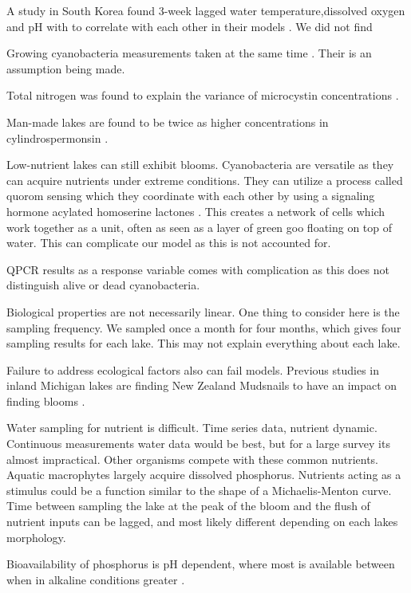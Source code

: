 A study in South Korea found 3-week lagged water temperature,dissolved oxygen and pH with to correlate with each other in their models \cite{ahn_evaluation_2011}.
We did not find

Growing cyanobacteria measurements taken at the same time . Their is an assumption being made.

Total nitrogen was found to explain the variance of microcystin concentrations \cite{taranu_predicting_2017}.

Man-made lakes are found to be twice as higher concentrations in cylindrospermonsin \cite{loftin_cyanotoxins_2016}.





Low-nutrient lakes can still exhibit blooms.
Cyanobacteria are versatile as they can acquire nutrients under extreme conditions. They can utilize a process called quorom sensing which they coordinate with each other by using a signaling hormone acylated homoserine lactones \cite{van_mooy_quorum_2012}. This creates a network of cells which work together as a unit, often as seen as a layer of green goo floating on top of water. This can complicate our model as this is not accounted for.

QPCR results as a response variable comes with complication as this does not distinguish alive or dead cyanobacteria.


Biological properties are not necessarily linear. One thing to consider here is the sampling frequency. We sampled once a month for four months, which gives four sampling results for each lake. This may not explain everything about each lake.

Failure to address ecological factors also can fail models. Previous studies in inland Michigan lakes are finding New Zealand Mudsnails to have an impact on finding blooms \cite{vanderploeg_zebra_2001}.


Water sampling for nutrient is difficult. Time series data, nutrient dynamic. Continuous measurements  water data would be best, but for a large survey its almost impractical. Other organisms compete with these common nutrients. Aquatic macrophytes largely acquire dissolved phosphorus. Nutrients acting as a stimulus could be a function similar to the shape of a Michaelis-Menton curve. Time between sampling the lake at the peak of the bloom and the flush of nutrient inputs can be lagged, and most likely different depending on each lakes morphology.

Bioavailability of phosphorus is pH dependent, where most is available between when in alkaline conditions greater \cite{lucas_relationships_1961}.




